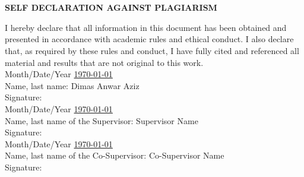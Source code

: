 \chapter*{}
\vspace*{-1.0cm}
\begin{center}
\normalfont\LARGE\textbf{SELF DECLARATION AGAINST PLAGIARISM}
\end{center}
I hereby declare that all information in this document has been obtained and presented in accordance with academic rules and ethical conduct. I also declare that, as required by these rules and conduct, I have fully cited and referenced all material and results that are not original to this work.\\[0.3cm]
\noindent
Month/Date/Year \underline{\mydate \today}\\
Name, last name: Dimas Anwar Aziz
\\[2.5cm]
Signature: \underline{\hspace*{5cm}}\\[0.4cm]
Month/Date/Year \underline{\mydate \today}\\
Name, last name of the Supervisor: Supervisor Name
\\[2.5cm]
Signature: \underline{\hspace*{5cm}}\\[0.4cm]
Month/Date/Year \underline{\mydate \today}\\
Name, last name of the Co-Supervisor: Co-Supervisor Name
\\[2.5cm]
Signature: \underline{\hspace*{5cm}}
